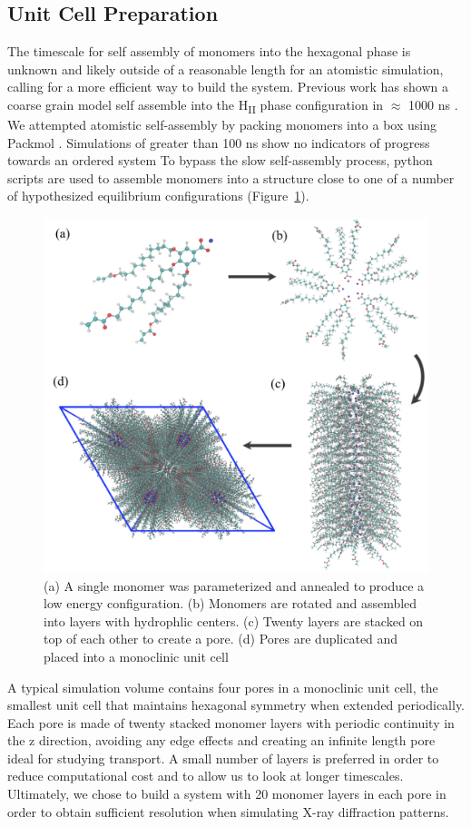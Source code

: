 \documentclass{article}
\begin{document}
  \subsection{Unit Cell Preparation}

  The timescale for self assembly of monomers into the hexagonal phase is
  unknown and likely outside of a reasonable length for an atomistic simulation,
  calling for a more efficient way to build the system.  Previous work has shown
  a coarse grain model self assemble into the H\textsubscript{II} phase
  configuration in $\approx$ 1000 ns \cite{mondal_self-assembly_2013}.  We
  attempted atomistic self-assembly by packing monomers into a box using Packmol
  \cite{martinez_packmol:_2009}.  Simulations of greater than 100 ns show no
  indicators of progress towards an ordered system To bypass the slow
  self-assembly process, python scripts are used to assemble monomers into a
  structure close to one of a number of hypothesized equilibrium configurations
  (Figure~\ref{fig:python}).

  \begin{figure}
	\centering
	\includegraphics[width=0.75\linewidth]{build.PNG} %
	\caption{(a) A single monomer was parameterized and annealed to produce a low energy
		configuration. (b) Monomers are rotated and assembled into layers with 
		hydrophlic centers. (c) Twenty layers are stacked on top of each other to create
		a pore. (d) Pores are duplicated and placed into a monoclinic unit cell}\label{fig:python}
  \end{figure}
  
  A typical simulation volume contains four pores in a monoclinic unit cell,
  the smallest unit cell that maintains hexagonal symmetry when extended
  periodically. Each pore is made of twenty stacked monomer layers with periodic
  continuity in the z direction, avoiding any edge effects and creating an
  infinite length pore ideal for studying transport. A small number of layers is
  preferred in order to reduce computational cost and to allow us to look at
  longer timescales. Ultimately, we chose to build a system with 20 monomer
  layers in each pore in order to obtain sufficient resolution when simulating
  X-ray diffraction patterns. %
\end{document}
